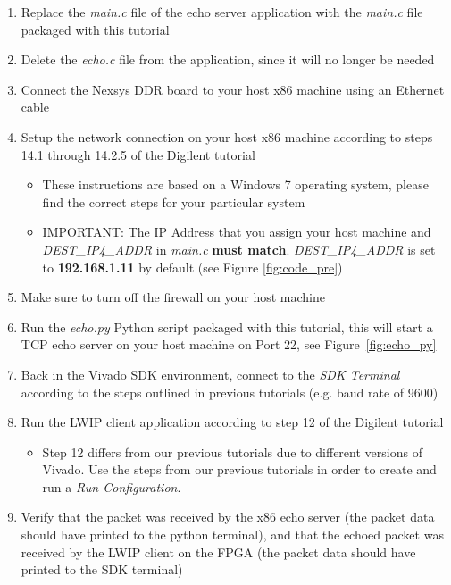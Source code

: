 \documentclass[11pt]{article}
\begin{document}
\begin{enumerate}
    \item Replace the \textit{main.c} file of the echo server application with the \textit{main.c} file packaged with this tutorial
    \item Delete the \textit{echo.c} file from the application, since it will no longer be needed
    \item Connect the Nexsys DDR board to your host x86 machine using an Ethernet cable
    \item Setup the network connection on your host x86 machine according to steps 14.1 through 14.2.5 of the Digilent tutorial
    \begin{itemize}
        \item These instructions are based on a Windows 7 operating system, please find the correct steps for your particular system
        
        \item IMPORTANT: The IP Address that you assign your host machine and \textit{DEST\_IP4\_ADDR} in \textit{main.c} \textbf{must match}. \textit{DEST\_IP4\_ADDR} is set to \textbf{192.168.1.11} by default (see Figure \ref{fig:code_pre})
    \end{itemize}
    \item Make sure to turn off the firewall on your host machine
    \item Run the \textit{echo.py} Python script packaged with this tutorial, this will start a TCP echo server on your host machine on Port 22, see Figure~\ref{fig:echo_py}
    \item Back in the Vivado SDK environment, connect to the \textit{SDK Terminal} according to the steps outlined in previous tutorials (e.g. baud rate of 9600)
    \item Run the LWIP client application according to step 12 of the Digilent tutorial
    \begin{itemize}
        \item Step 12 differs from our previous tutorials due to different versions of Vivado. Use the steps from our previous tutorials in order to create and run a \textit{Run Configuration}.
    \end{itemize}
    \item Verify that the packet was received by the x86 echo server (the packet data should have printed to the python terminal), and that the echoed packet was received by the LWIP client on the FPGA (the packet data should have printed to the SDK terminal)
\end{enumerate}
\end{document}
